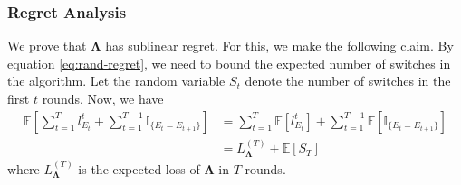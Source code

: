 \documentclass[11pt]{article}
\begin{document}
\subsubsection*{Regret Analysis}
We prove that $\mathbf{\Lambda}$ has sublinear regret. For this, we make the following claim. By equation \eqref{eq:rand-regret},
we need to bound the expected number of switches in the algorithm. Let the random variable $S_{t}$ denote the number of switches
in the first $t$ rounds. Now, we have
\begin{align}
    \mathbb{E}\left[ \sum_{t=1}^{T} l_{E_{t}}^{t} + \sum_{t=1}^{T-1} \mathbb{I}_{\{E_{t} = E_{t+1}\}} \right] &= \sum_{t=1}^{T} \mathbb{E}\left[ l_{E_{t}}^{t} \right] + \sum_{t=1}^{T-1} \mathbb{E}\left[ \mathbb{I}_{\{E_{t} = E_{t+1}\}} \right] \\
    &= L_{\mathbf{\Lambda}}^{(T)} + \mathbb{E}\left[ S_{T} \right]
\end{align}
where $L_{\mathbf{\Lambda}}^{(T)}$ is the expected loss of $\mathbf{\Lambda}$ in $T$ rounds.
\end{document}
